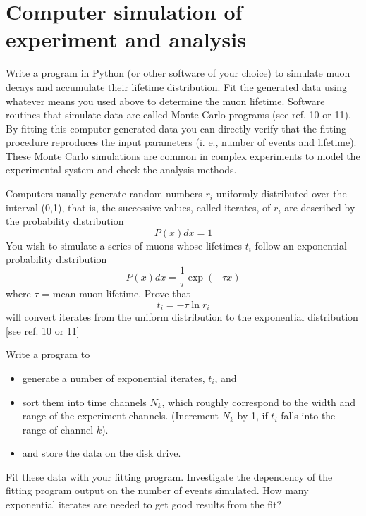 \documentclass{../lab}
\begin{document}
\section{Computer simulation of experiment and analysis}

Write a program in Python (or other software of your choice) to simulate muon decays and accumulate their lifetime distribution. Fit the generated data using whatever means you used above to determine the muon lifetime. Software routines that simulate data are called Monte Carlo programs (see ref. 10 or 11). By fitting this computer-generated data you can directly verify that the fitting procedure reproduces the input parameters (i. e., number of events and lifetime). These Monte Carlo simulations are common in complex experiments to model the experimental system and check the analysis methods.

Computers usually generate random numbers $r_i$ uniformly distributed over the interval (0,1), that is, the successive values, called iterates, of $r_i$ are described by the probability distribution
\begin{equation}
    P(x)dx = 1
\end{equation}
You wish to simulate a series of muons whose lifetimes $t_i$ follow an exponential probability distribution
\begin{equation}
    P(x)dx = \frac{1}{\tau}\exp(-\tau x)
\end{equation}
where $\tau$ = mean muon lifetime. Prove that
\begin{equation}
    t_i=-\tau \ln r_i
\end{equation}
will convert iterates from the uniform distribution to the exponential distribution [see ref. 10 or 11]

Write a program to

\begin{itemize}
    \item generate a number of exponential iterates, $t_i$, and

    \item sort them into time channels $N_k$, which roughly correspond to the width and range of the experiment channels. (Increment $N_k$ by 1, if $t_i$ falls into the range of channel $k$).

    \item and store the data on the disk drive.
\end{itemize}

Fit these data with your fitting program. Investigate the dependency of the fitting program output on the number of events simulated. How many exponential iterates are needed to get good results from the fit?
\end{document}
